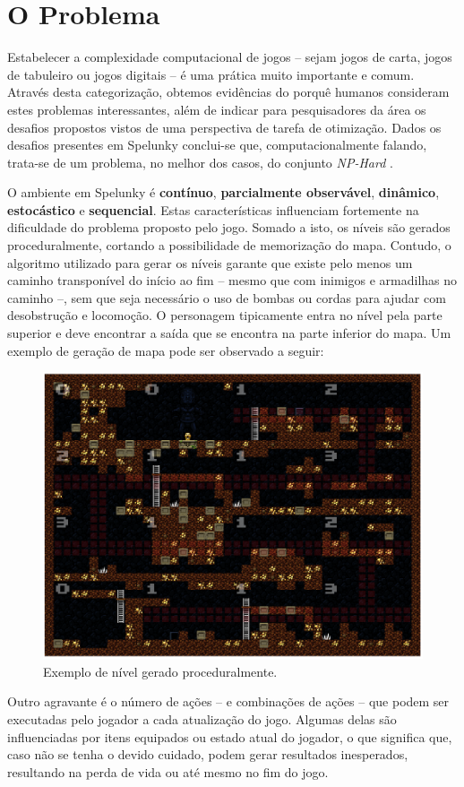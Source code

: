 \chapter{\label{chap:problem}O Problema}
Estabelecer a complexidade computacional de jogos -- sejam jogos de carta,
jogos de tabuleiro ou jogos digitais -- é uma prática muito importante e comum.
Através desta categorização, obtemos evidências do porquê humanos consideram
estes problemas interessantes, além de indicar para pesquisadores da área os
desafios propostos vistos de uma perspectiva de tarefa de otimização.  Dados os
desafios presentes em Spelunky conclui-se que, computacionalmente falando,
trata-se de um problema, no melhor dos casos, do conjunto \textit{NP-Hard}
\cite{SPELUNKYHARD}.

O ambiente em Spelunky é \textbf{contínuo}, \textbf{parcialmente observável},
\textbf{dinâmico}, \textbf{estocástico} e \textbf{sequencial}. Estas
características influenciam fortemente na dificuldade do problema proposto pelo
jogo. Somado a isto, os níveis são gerados proceduralmente, cortando a
possibilidade de memorização do mapa. Contudo, o algoritmo utilizado para gerar
os níveis garante que existe pelo menos um caminho transponível do início ao fim
-- mesmo que com inimigos e armadilhas no caminho --, sem que seja necessário o
uso de bombas ou cordas para ajudar com desobstrução e locomoção. O personagem
tipicamente entra no nível pela parte superior e deve encontrar a saída que se
encontra na parte inferior do mapa. Um exemplo de geração de mapa pode ser
observado a seguir:

\begin{figure}[htb!]
\centering\includegraphics[width=.65\textwidth]{fig/spelunky-level-example.png}
\caption {\label{fig:spelunky-level-example}Exemplo de nível gerado
proceduralmente.} \end{figure}

Outro agravante é o número de ações -- e combinações de ações -- que podem ser
executadas pelo jogador a cada atualização do jogo. Algumas delas são
influenciadas por itens equipados ou estado atual do jogador, o que significa
que, caso não se tenha o devido cuidado, podem gerar resultados inesperados,
resultando na perda de vida ou até mesmo no fim do jogo.

